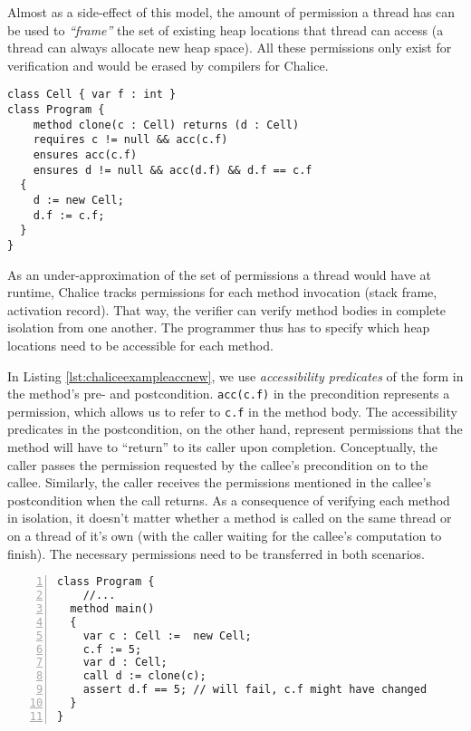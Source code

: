 Almost as a side-effect of this model, the amount of permission a thread has can be used to \emph{``frame''} the set of  existing heap locations that thread can access (a thread can always allocate new heap space).
All these permissions only exist for verification and would be erased by compilers for Chalice.

\begin{lstlisting}[language=Chalice,float,caption={Chalice example of object creation and (write) accessibility predicates.},label={lst:chaliceexampleaccnew}]
class Cell { var f : int }
class Program {
 	method clone(c : Cell) returns (d : Cell)
    requires c != null && acc(c.f)
    ensures acc(c.f)
    ensures d != null && acc(d.f) && d.f == c.f
  {
    d := new Cell;
    d.f := c.f;
  }
}
\end{lstlisting}

As an under-approximation of the set of permissions a thread would have at runtime, Chalice tracks permissions for each method invocation (stack frame, activation record). 
That way, the verifier can verify method bodies in complete isolation from one another. 
The programmer thus has to specify which heap locations need to be accessible for each method.

In Listing \ref{lst:chaliceexampleaccnew}, we use \emph{accessibility predicates} of the form  in the method's pre- and postcondition. 
\lstinline!acc(c.f)! in the precondition represents a permission, which allows us to refer to \lstinline!c.f! in the method body. 
The accessibility predicates in the postcondition, on the other hand, represent permissions that the method will have to ``return'' to its caller upon completion.
Conceptually, the caller passes the permission requested by the callee's precondition on to the callee.
Similarly, the caller receives the permissions mentioned in the callee's postcondition when the call returns.
As a consequence of verifying each method in isolation, it doesn't matter whether a method is called on the same thread or on a thread of it's own (with the caller waiting for the callee's computation to finish). 
The necessary permissions need to be transferred in both scenarios.

\begin{lstlisting}[float,language=Chalice,caption={Calling \lstinline!Program::clone! (extension of Listing \ref{lst:chaliceexampleaccnew})},label={lst:chaliceuseclonefail},numbers=left]
class Program {  
	//...
  method main()
  {
    var c : Cell :=  new Cell;
    c.f := 5;
    var d : Cell;
    call d := clone(c);
    assert d.f == 5; // will fail, c.f might have changed
  }
}
\end{lstlisting}

